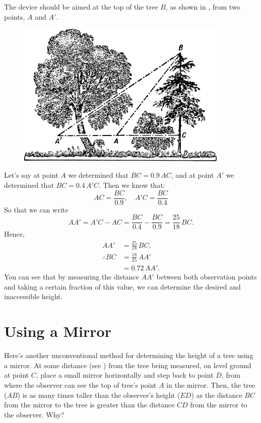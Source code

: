 \ans The device should be aimed at the top of the tree $B$, as shown in , from two points, $A$ and $A'$. 

\begin{figure}[h!]
\centering
\includegraphics[width=0.9\textwidth]{figures/ch-01/fig-01-13.pdf}
\end{figure}

Let's say at point $A$ we determined that $BC = 0.9\,AC$, and at point $A'$ we determined that $BC = 0.4\,A'C$. Then we know that:
\begin{equation*}%
AC = \frac{BC}{0.9},\quad   A'C  = \frac{BC}{0.4} 
\end{equation*}
So that we can write
\begin{equation*}%
AA' = A'C - AC = \frac{BC}{0.4} - \frac{BC}{0.9} = \frac{25}{18} \,BC.
\end{equation*}
Hence,
\begin{align*}%
AA' & = \frac{25}{18} \,BC, \\ 
\therefore BC & = \frac{18}{25} \,AA' \\
& = 0.72 \, AA'.
\end{align*}
You can see that by measuring the distance $AA'$ between both observation points and taking a certain fraction of this value, we can determine the desired and inaccessible height.

\section{Using a Mirror}
\label{sec-1.8}


\ques Here's another unconventional method for determining the height of a tree using a mirror. At some distance (see ) from the tree being measured, on level ground at point $C$, place a small mirror horizontally and step back to point $D$, from where the observer can see the top of tree's point $A$ in the mirror. Then, the tree ($AB$) is as many times taller than the observer's height ($ED$) as the distance $BC$ from the mirror to the tree is greater than the distance $CD$ from the mirror to the observer. Why?

